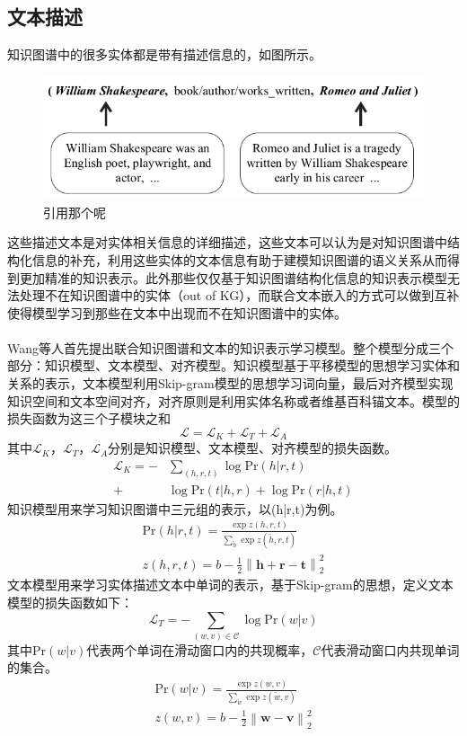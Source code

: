 \documentclass[twocolumn]{article}
\newcommand{\upcite}[1]{\textsuperscript{\textsuperscript{\cite{#1}}}}
\begin{document}
	
\subsection{文本描述}
	知识图谱中的很多实体都是带有描述信息的，如图所示。
	\begin{figure}[ht]
		\centering
		\includegraphics[width=0.8\linewidth]{dkrl.png}
		\caption{引用那个呢}
\end{figure}
	这些描述文本是对实体相关信息的详细描述，这些文本可以认为是对知识图谱中结构化信息的补充，利用这些实体的文本信息有助于建模知识图谱的语义关系从而得到更加精准的知识表示。此外那些仅仅基于知识图谱结构化信息的知识表示模型无法处理不在知识图谱中的实体（out of KG），而联合文本嵌入的方式可以做到互补使得模型学习到那些在文本中出现而不在知识图谱中的实体。
	
	Wang等人\upcite{Wang}首先提出联合知识图谱和文本的知识表示学习模型。整个模型分成三个部分：知识模型、文本模型、对齐模型。知识模型基于平移模型的思想学习实体和关系的表示，文本模型利用Skip-gram模型的思想学习词向量，最后对齐模型实现知识空间和文本空间对齐，对齐原则是利用实体名称或者维基百科锚文本。模型的损失函数为这三个子模块之和
	\begin{equation}
	\mathcal{L}=\mathcal{L}_K+\mathcal{L}_T+\mathcal{L}_A
	\end{equation}
	其中$\mathcal{L}_K$，$\mathcal{L}_T$，$\mathcal{L}_A$分别是知识模型、文本模型、对齐模型的损失函数。
	\begin{equation}
	\begin{split}
		\mathcal{L}_K=-&\sum_{(h,r,t)}\log \text{Pr}(h|r,t) \\
		+& \log \text{Pr}(t|h,r)+\log \text{Pr}(r|h,t)
	\end{split}
	\end{equation}
	知识模型用来学习知识图谱中三元组的表示，以(h|r,t)为例。
	\begin{gather}
		\text{Pr}(h|r,t)=\frac{\exp{z(h,r,t)}}{\sum_{\widetilde{h}}\exp{z(\widetilde{h},r,t)}} \\
		z(h,r,t)=b-\frac{1}{2}\left \| \textbf{h}+\textbf{r}-\textbf{t} \right \|_2^2
	\end{gather}
	文本模型用来学习实体描述文本中单词的表示，基于Skip-gram的思想，定义文本模型的损失函数如下：
	\begin{equation}
		\mathcal{L}_T=-\sum_{(w,v)\in \mathcal{C}}\log \text{Pr}(w|v)
	\end{equation}
	其中$\text{Pr}(w|v)$代表两个单词在滑动窗口内的共现概率，$\mathcal{C}$代表滑动窗口内共现单词的集合。
	\begin{gather}
	\text{Pr}(w|v)=\frac{\exp{z(w,v)}}{\sum_{\widetilde{w}}\exp{z(\widetilde{w},v)}} \\
	z(w,v)=b-\frac{1}{2}\left \|\textbf{w}-\textbf{v}  \right \|_2^2
	\end{gather}
	
\end{document}
